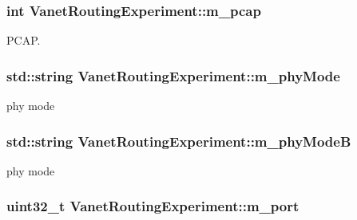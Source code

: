 \subsubsection[{\texorpdfstring{m\+\_\+pcap}{m_pcap}}]{\setlength{\rightskip}{0pt plus 5cm}int Vanet\+Routing\+Experiment\+::m\+\_\+pcap\hspace{0.3cm}{\ttfamily [private]}}\hypertarget{classVanetRoutingExperiment_ac7fb62cd5e00be235c70ac0848646ba4}{}\label{classVanetRoutingExperiment_ac7fb62cd5e00be235c70ac0848646ba4}


P\+C\+AP. 

\subsubsection[{\texorpdfstring{m\+\_\+phy\+Mode}{m_phyMode}}]{\setlength{\rightskip}{0pt plus 5cm}std\+::string Vanet\+Routing\+Experiment\+::m\+\_\+phy\+Mode\hspace{0.3cm}{\ttfamily [private]}}\hypertarget{classVanetRoutingExperiment_af9a40202146f6e8b06fb369d697a1fe9}{}\label{classVanetRoutingExperiment_af9a40202146f6e8b06fb369d697a1fe9}


phy mode 

\subsubsection[{\texorpdfstring{m\+\_\+phy\+ModeB}{m_phyModeB}}]{\setlength{\rightskip}{0pt plus 5cm}std\+::string Vanet\+Routing\+Experiment\+::m\+\_\+phy\+ModeB\hspace{0.3cm}{\ttfamily [private]}}\hypertarget{classVanetRoutingExperiment_a82dffa1e0b2ddfd1d9afd33e35d33dfb}{}\label{classVanetRoutingExperiment_a82dffa1e0b2ddfd1d9afd33e35d33dfb}


phy mode 

\subsubsection[{\texorpdfstring{m\+\_\+port}{m_port}}]{\setlength{\rightskip}{0pt plus 5cm}uint32\+\_\+t Vanet\+Routing\+Experiment\+::m\+\_\+port\hspace{0.3cm}{\ttfamily [private]}}\hypertarget{classVanetRoutingExperiment_ab49e9c29d970f6519fffa45c8285a180}{}\label{classVanetRoutingExperiment_ab49e9c29d970f6519fffa45c8285a180}


